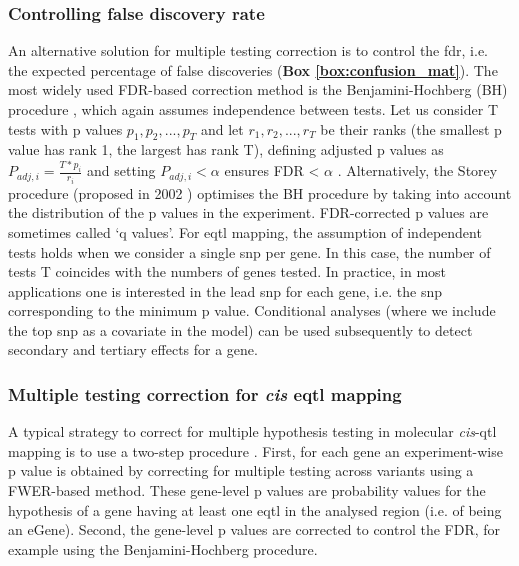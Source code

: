 \subsubsection{Controlling false discovery rate}

An alternative solution for multiple testing correction is to control the \gls{fdr}, i.e. the expected percentage of false discoveries (\textbf{Box \ref{box:confusion_mat}}).
The most widely used FDR-based correction method is the Benjamini-Hochberg (BH) procedure \cite{benjamini1995controlling}, which again assumes independence between tests. 
Let us consider T tests with p values $p_1, p_2, ..., p_T$ and let $r_1, r_2, ..., r_T$ be their ranks (the smallest p value has rank 1, the largest has rank T), defining adjusted p values as $P_{adj,i} = \frac{T*p_i}{r_i} $ and setting $P_{adj,i} <\alpha$ ensures FDR < $\alpha$ \cite{yekutieli1999resampling}.
Alternatively, the Storey procedure (proposed in 2002 \cite{storey2002direct, storey2003statistical}) optimises the BH procedure by taking into account the distribution of the p values in the experiment.
FDR-corrected p values 
are sometimes called `q values'.
For \gls{eqtl} mapping, the assumption of independent tests holds when we consider a single \gls{snp} per gene.
In this case, the number of tests T coincides with the numbers of genes tested.
In practice, in most applications one is interested in the lead \gls{snp} for each gene, i.e. the \gls{snp} corresponding to the minimum p value.
Conditional analyses (where we include the top \gls{snp} as a covariate in the model) can be used subsequently to detect secondary and tertiary effects for a gene.

\subsubsection{Multiple testing correction for \textit{cis} e\gls{qtl} mapping}

A typical strategy to correct for multiple hypothesis testing in molecular \textit{cis}-\gls{qtl} mapping is to use a two-step procedure \cite{gtex2015genotype}. 
First, for each gene an experiment-wise p value is obtained by correcting for multiple testing across variants using a FWER-based method. 
These gene-level p values are probability values for the hypothesis of a gene having at least one e\gls{qtl} in the analysed region (i.e. of being an eGene). 
Second, the gene-level p values are corrected to control the FDR, for example using the Benjamini-Hochberg procedure.\\

